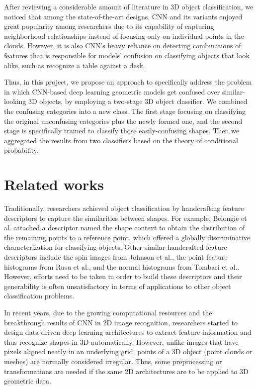 \documentclass{article}
\begin{document}
After reviewing a considerable amount of literature in 3D object classification, we noticed that among the state-of-the-art designs, CNN and its variants enjoyed great popularity among researchers due to its capability of capturing neighborhood relationships instead of focusing only on individual points in the clouds. However, it is also CNN's heavy reliance on detecting combinations of features that is responsible for models' confusion on classifying objects that look alike, such as recognize a table against a desk.

Thus, in this project, we propose an approach to specifically address the problem in which CNN-based deep learning geometric models get confused over similar-looking 3D objects, by employing a two-stage 3D object classifier. We combined the confusing categories into a new class. The first stage focusing on classifying the original unconfusing categories plus the newly formed one, and the second stage is specifically trained to classify those easily-confusing shapes. Then we aggregated the results from two classifiers based on the theory of conditional probability.

\section{Related works}
Traditionally, researchers achieved object classification by handcrafting feature descriptors to capture the similarities between shapes. For example, Belongie et al.\cite{shapecontexts} attached a descriptor named the shape context to obtain the distribution of the remaining points to a reference point, which offered a globally discriminative characterization for classifying objects. Other similar handcrafted feature descriptors include the spin images from Johnson et al.\cite{spin}, the point feature histograms from Rusu et al.\cite{featurehist}, and the normal histograms from Tombari et al.\cite{normalhist}. However, efforts need to be taken in order to build these descriptors and their generability is often unsatisfactory in terms of applications to other object classification problems.

In recent years, due to the growing computational resources and the breakthrough results of CNN in 2D image recognition, researchers started to design data-driven deep learning architectures to extract feature information and thus recognize shapes in 3D automatically. However, unlike images that have pixels aligned neatly in an underlying grid, points of a 3D object (point clouds or meshes) are normally considered irregular. Thus, some preprocessing or transformations are needed if the same 2D architectures are to be applied to 3D geometric data.
\end{document}
